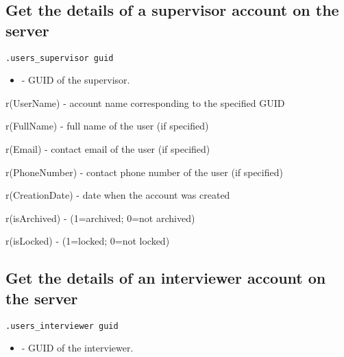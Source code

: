 \subsection{Get the details of a supervisor account on the server}
\begin{lstlisting}[style=CommandLineStyle]
.users_supervisor guid
\end{lstlisting}

\paramsheader
\begin{itemize}
\item {} - GUID of the supervisor.
\end{itemize}

\savedres
\begin{compactitem}
    \item r(UserName) - account name corresponding to the specified GUID
    \item r(FullName) - full name of the user (if specified)
    \item r(Email) - contact email of the user (if specified)
    \item r(PhoneNumber) - contact phone number of the user (if specified)
    \item r(CreationDate) - date when the account was created
    \item r(isArchived) - (1=archived; 0=not archived)
    \item r(isLocked) - (1=locked; 0=not locked)
\end{compactitem}


\subsection{Get the details of an interviewer account on the server}
\begin{lstlisting}[style=CommandLineStyle]
.users_interviewer guid
\end{lstlisting}

\paramsheader
\begin{itemize}
\item {} - GUID of the interviewer.
\end{itemize}


